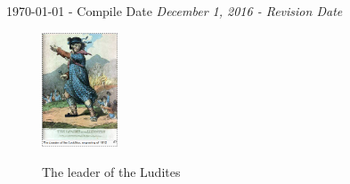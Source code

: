 \begin{titlepage}

{\large \today{ - Compile Date } \textsl{December 1, 2016 - Revision Date}}\\[3cm] %

%
%
\begin{figure}[!h]
\centering
\href{https://en.wikipedia.org/wiki/Luddite}{\includegraphics[width=0.2\textwidth]{figures/ludite_leader}}
\caption{The leader of the Ludites}
\label{title_page_1_ludites}
\end{figure}
 

\vfill %

\end{titlepage}